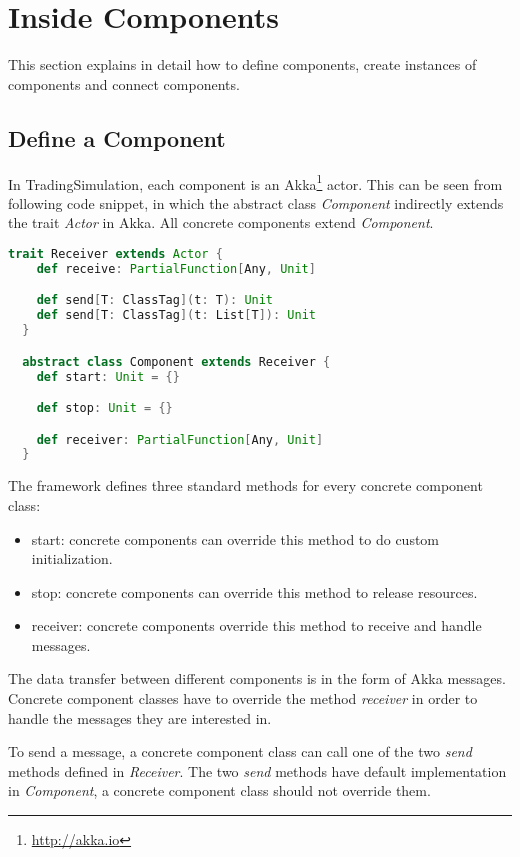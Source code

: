 \section{Inside Components}
\label{sec:2}

This section explains in detail how to define components, create instances of components and connect components.

\subsection{Define a Component}

In TradingSimulation, each component is an Akka\footnote{\url{http://akka.io}} actor. This can be seen from following code snippet, in which the abstract class \emph{Component} indirectly extends the trait \emph{Actor} in Akka. All concrete components extend \emph{Component}.

\begin{lstlisting}[language=Scala]
  trait Receiver extends Actor {
    def receive: PartialFunction[Any, Unit]

    def send[T: ClassTag](t: T): Unit
    def send[T: ClassTag](t: List[T]): Unit
  }

  abstract class Component extends Receiver {
    def start: Unit = {}

    def stop: Unit = {}

    def receiver: PartialFunction[Any, Unit]
  }
\end{lstlisting}

The framework defines three standard methods for every concrete component class:

\begin{itemize}
\item{start}: concrete components can override this method to do custom initialization.
\item{stop}: concrete components can override this method to release resources.
\item{receiver}: concrete components override this method to receive and handle messages.
\end{itemize}

The data transfer between different components is in the form of Akka messages. Concrete component classes have to override the method \emph{receiver} in order to handle the messages they are interested in.

To send a message, a concrete component class can call one of the two \emph{send} methods defined in \emph{Receiver}. The two \emph{send} methods have default implementation in \emph{Component}, a concrete component class should not override them.

